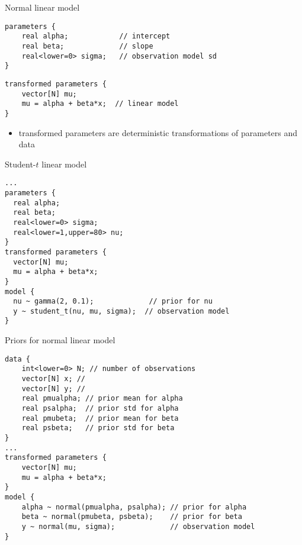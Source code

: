 \documentclass[finnish,english,t]{beamer}
\begin{document}
\begin{frame}[fragile]{Normal linear model}
  
  {\small
   { 
  \begin{verbatim}
parameters {
    real alpha;            // intercept
    real beta;             // slope
    real<lower=0> sigma;   // observation model sd
}
\end{verbatim}
    }
    \vspace{-1.5\baselineskip}
\begin{verbatim}
transformed parameters {
    vector[N] mu;
    mu = alpha + beta*x;  // linear model
}
\end{verbatim}
  }
  
  \begin{itemize}
  \item transformed parameters are deterministic transformations of parameters and data
  \end{itemize}
\end{frame} 

\begin{frame}[fragile]{Student-$t$ linear model}
  
  {\small
  \begin{verbatim}
...
parameters {
  real alpha; 
  real beta; 
  real<lower=0> sigma;
  real<lower=1,upper=80> nu;
}
transformed parameters {
  vector[N] mu;
  mu = alpha + beta*x;
}
model {
  nu ~ gamma(2, 0.1);             // prior for nu
  y ~ student_t(nu, mu, sigma);  // observation model
}
  \end{verbatim}
}
\end{frame} 

\begin{frame}[fragile]{Priors for normal linear model}
  
  {\small
  \begin{verbatim}
data {
    int<lower=0> N; // number of observations 
    vector[N] x; // 
    vector[N] y; // 
    real pmualpha; // prior mean for alpha
    real psalpha;  // prior std for alpha
    real pmubeta;  // prior mean for beta
    real psbeta;   // prior std for beta
}
...
transformed parameters {
    vector[N] mu;
    mu = alpha + beta*x;
}
model {
    alpha ~ normal(pmualpha, psalpha); // prior for alpha
    beta ~ normal(pmubeta, psbeta);    // prior for beta
    y ~ normal(mu, sigma);             // observation model
}
  \end{verbatim}
}
\end{frame} 
\end{document}
